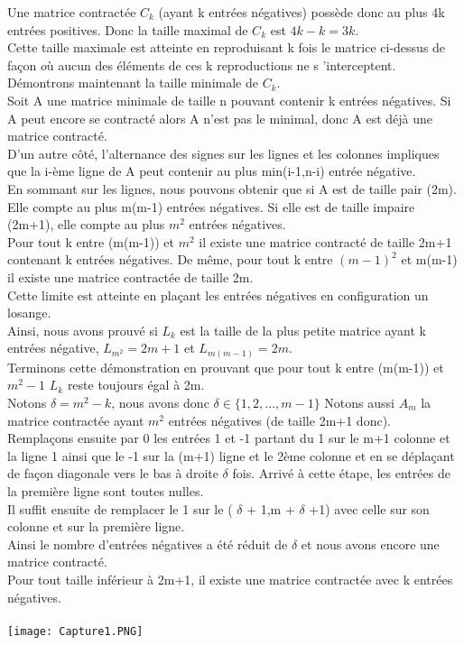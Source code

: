 \documentclass{book}
\begin{document}
   Une matrice contractée $C_k$ (ayant k entrées négatives) possède donc au plus 4k entrées positives. Donc la taille maximal de $C_k$ est $4k-k=3k$.\\ Cette taille maximale est atteinte en reproduisant k fois le matrice ci-dessus de façon $où$ aucun des éléments de ces k reproductions ne s 'interceptent. \\
   Démontrons maintenant la taille minimale de $C_k$.\\
   Soit A une matrice minimale de taille n pouvant contenir k entrées négatives. Si A peut encore se contracté alors A n'est pas le minimal, donc A est déjà une matrice contracté.\\
   D'un autre côté, l'alternance des signes sur les lignes et les colonnes impliques que la i-ème ligne de A peut contenir au plus min(i-1,n-i) entrée négative.\\
   En sommant sur les lignes, nous pouvons obtenir que si A est de taille pair (2m). Elle compte au plus m(m-1) entrées négatives. Si elle est de taille impaire (2m+1), elle compte au plus $m^2$ entrées négatives.\\
   Pour tout k entre (m(m-1)) et $m^2$ il existe une matrice contracté de taille 2m+1 contenant k entrées négatives. De même, pour tout k entre $(m-1)^2$ et m(m-1) il existe une matrice contractée de taille 2m.\\
   Cette limite est atteinte en plaçant les entrées négatives en configuration un losange.\\
   Ainsi, nous avons prouvé si $L_k$ est la taille de la plus petite matrice ayant k entrées négative, $L_{m^2}=2m+1$ et $L_{m(m-1)}=2m$. \\ Terminons cette démonstration en prouvant que pour tout k entre (m(m-1)) et $m^2-1$ $L_k$ reste toujours égal à 2m. \\
   Notons $\delta = m^2-k$, nous avons donc $\delta \in \{ 1, 2, ... , m-1 \}$ Notons aussi $A_m$ la matrice contractée ayant $m^2$ entrées négatives (de taille 2m+1 donc).\\
   Remplaçons ensuite par 0 les entrées 1 et -1 partant du 1 sur le m+1 colonne et la ligne 1 ainsi que le -1 sur la (m+1) ligne et le 2ème colonne et en se déplaçant de façon diagonale vers le bas à droite $\delta$ fois. Arrivé à cette étape, les entrées de la première ligne sont toutes nulles.\\
   Il suffit ensuite de remplacer le 1 sur le ( $\delta$ + 1,m + $\delta$ +1) avec celle sur son colonne et sur la première ligne. \\
   Ainsi le nombre d'entrées négatives a été réduit de $\delta$ et nous avons encore une matrice contracté.\\ Pour tout taille inférieur à 2m+1, il existe une matrice contractée avec k entrées négatives.  \\\\ 
   \texttt{[image: Capture1.PNG]}
\end{document}
